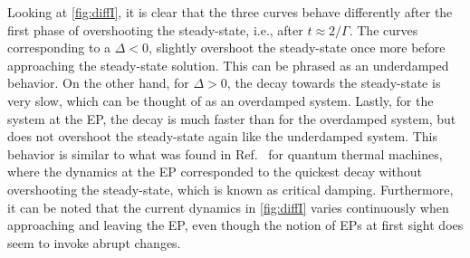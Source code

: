 \documentclass[../main.tex]{subfiles}
\begin{document}
Looking at \cref{fig:diffI}, it is clear that the three curves behave differently after the first phase of overshooting the steady-state, i.e., after $t\approx 2/\Gamma$. The curves corresponding to a $\Delta<0$, slightly overshoot the steady-state once more before approaching the steady-state solution. This can be phrased as an underdamped behavior. On the other hand, for $\Delta>0$, the decay towards the steady-state is very slow, which can be thought of as an overdamped system. Lastly, for the system at the EP, the decay is much faster than for the overdamped system, but does not overshoot the steady-state again like the underdamped system. This behavior is similar to what was found in Ref.~\cite{thermal} for quantum thermal machines, where the dynamics at the EP corresponded to the quickest decay without overshooting the steady-state, which is known as critical damping. Furthermore, it can be noted that the current dynamics in \cref{fig:diffI} varies continuously when approaching and leaving the EP, even though the notion of EPs at first sight does seem to invoke abrupt changes.
\end{document}
